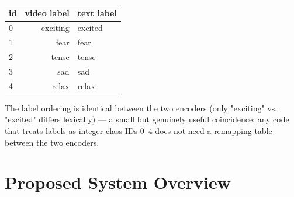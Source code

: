 \documentclass[11pt]{article}
\begin{document}
\begin{center}
\begin{tabular}{@{}lrl@{}}
\toprule
\textbf{id} & \textbf{video label} & \textbf{text label} \\
\midrule
0 & exciting & excited \\
1 & fear & fear \\
2 & tense & tense \\
3 & sad & sad \\
4 & relax & relax \\
\bottomrule
\end{tabular}
\end{center}

The label ordering is identical between the two encoders (only "exciting" vs. "excited" differs
lexically) — a small but genuinely useful coincidence: any code that treats labels as integer
class IDs 0--4 does not need a remapping table between the two encoders.

\section{Proposed System Overview}
\end{document}
